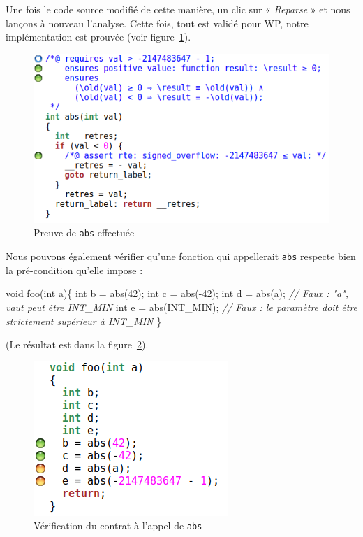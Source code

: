 \documentclass[12pt,francais,]{scrbook}
\newenvironment{Shaded}{}{}
\newcommand{\DataTypeTok}[1]{\textcolor[rgb]{0.56,0.13,0.00}{{#1}}}
\newcommand{\DecValTok}[1]{\textcolor[rgb]{0.25,0.63,0.44}{{#1}}}
\newcommand{\CommentTok}[1]{\textcolor[rgb]{0.38,0.63,0.69}{\textit{{#1}}}}
\newcommand{\NormalTok}[1]{{#1}}
\begin{document}
Une fois le code source modifié de cette manière, un clic sur «
\emph{Reparse} » et nous lançons à nouveau l'analyse. Cette fois, tout
est validé pour WP, notre implémentation est prouvée (voir
figure~\ref{fig:2-1-2-abs-1}).

\begin{figure}[htbp]
\centering
\includegraphics[scale=0.5]{2-1-2-abs-1.png}
\caption{Preuve de \texttt{abs} effectuée}
\label{fig:2-1-2-abs-1}
\end{figure}

\clearpage

Nous pouvons également vérifier qu'une fonction qui appellerait
\texttt{abs} respecte bien la pré-condition qu'elle impose :

\begin{footnotesize}\begin{Shaded}
\begin{Highlighting}[]
\DataTypeTok{void} \NormalTok{foo(}\DataTypeTok{int} \NormalTok{a)\{}
   \DataTypeTok{int} \NormalTok{b = abs(}\DecValTok{42}\NormalTok{);}
   \DataTypeTok{int} \NormalTok{c = abs(-}\DecValTok{42}\NormalTok{);}
   \DataTypeTok{int} \NormalTok{d = abs(a);       }\CommentTok{// Faux : "a", vaut peut être INT_MIN}
   \DataTypeTok{int} \NormalTok{e = abs(INT_MIN); }\CommentTok{// Faux : le paramètre doit être strictement supérieur à INT_MIN}
\NormalTok{\}}
\end{Highlighting}
\end{Shaded}\end{footnotesize}

(Le résultat est dans la figure~\ref{fig:2-1-2-foo-1}).

\begin{figure}[htbp]
\centering
\includegraphics[scale=0.5]{2-1-2-foo-1.png}
\caption{Vérification du contrat à l'appel de \texttt{abs}}
\label{fig:2-1-2-foo-1}
\end{figure}
\end{document}
